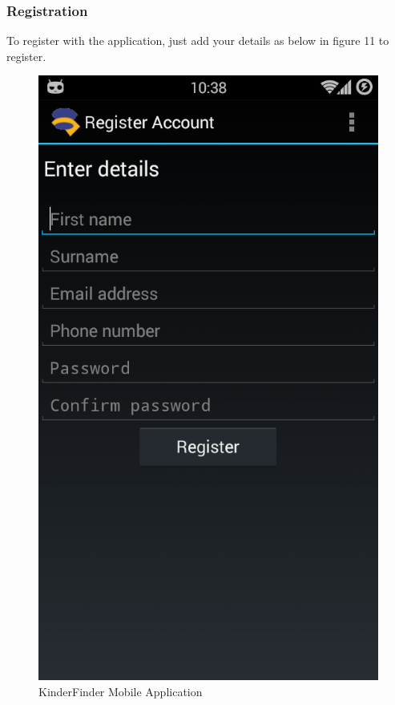 \documentclass{article}
\begin{document}
\subsubsection{Registration}
To register with the application, just add your details as below in figure 11 to register.
\begin{figure}[H]
\centering
\includegraphics[scale=0.4]{Main App - Registration.png}
\caption{KinderFinder Mobile Application}
\end{figure}
\end{document}
